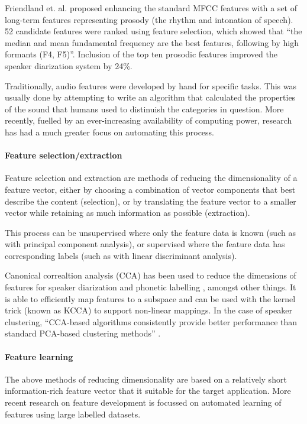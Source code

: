 Friendland et. al. \citep{Friedland2009} proposed enhancing the standard MFCC features with a set of long-term features
representing prosody (the rhythm and intonation of speech). 52 candidate features were ranked using feature selection,
which showed that ``the median and mean fundamental frequency are the best features, following by high formants (F4,
F5)''. Inclusion of the top ten prosodic features improved the speaker diarization system by 24\%.

Traditionally, audio features were developed by hand for specific tasks. This was usually done by attempting to write
an algorithm that calculated the properties of the sound that humans used to distinuish the categories in question.
More recently, fuelled by an ever-increasing availability of computing power, research has had a much greater focus on
automating this process.

\paragraph{Feature selection/extraction}
Feature selection and extraction are methods of reducing the dimensionality of a feature vector, either by choosing a
combination of vector components that best describe the content (selection), or by translating the feature vector to a
smaller vector while retaining as much information as possible (extraction).

This process can be unsupervised where only the feature data is known (such as with principal component analysis), or
supervised where the feature data has corresponding labels (such as with linear discriminant analysis).

Canonical correaltion analysis (CCA) has been used to reduce the dimensions of features for speaker diarization
\citep{Chaudhuri2009} and phonetic labelling \citep{Arora2014}, amongst other things. It is able to efficiently map
features to a subspace and can be used with the kernel trick (known as KCCA) to support non-linear mappings. In the
case of speaker clustering, ``CCA-based algorithms consistently provide better performance than standard PCA-based
clustering methods'' \citep{Chaudhuri2009}.

\paragraph{Feature learning}
The above methods of reducing dimensionality are based on a relatively short information-rich feature vector that it
suitable for the target application.  More recent research on feature development is focussed on automated learning of
features using large labelled datasets.

